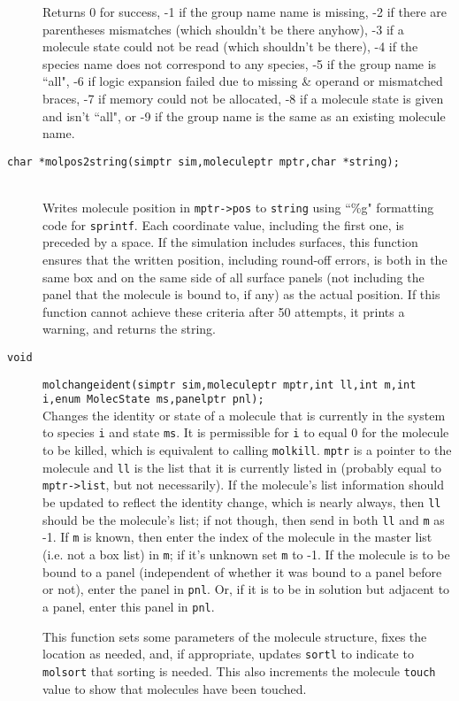 \documentclass {scrbook}
\newcommand {\ttt} {\texttt}
\begin{document}
\begin{description}
Returns 0 for success, -1 if the group name name is missing, -2 if there are parentheses mismatches (which shouldn't be there anyhow), -3 if a molecule state could not be read (which shouldn't be there), -4 if the species name does not correspond to any species, -5 if the group name is ``all", -6 if logic expansion failed due to missing \& operand or mismatched braces, -7 if memory could not be allocated, -8 if a molecule state is given and isn't ``all", or -9 if the group name is the same as an existing molecule name.

\item[\ttt{char *molpos2string(simptr sim,moleculeptr mptr,char *string);}]
\hfill \\
Writes molecule position in \ttt{mptr->pos} to \ttt{string} using ``\%g" formatting code for \ttt{sprintf}. Each coordinate value, including the first one, is preceded by a space. If the simulation includes surfaces, this function ensures that the written position, including round-off errors, is both in the same box and on the same side of all surface panels (not including the panel that the molecule is bound to, if any) as the actual position. If this function cannot achieve these criteria after 50 attempts, it prints a warning, and returns the string.

\item[\ttt{void}]
\ttt{molchangeident(simptr sim,moleculeptr mptr,int ll,int m,int i,enum MolecState ms,panelptr pnl);} \\
Changes the identity or state of a molecule that is currently in the system to species \ttt{i} and state \ttt{ms}. It is permissible for \ttt{i} to equal 0 for the molecule to be killed, which is equivalent to calling \ttt{molkill}. \ttt{mptr} is a pointer to the molecule and \ttt{ll} is the list that it is currently listed in (probably equal to \ttt{mptr->list}, but not necessarily). If the molecule's list information should be updated to reflect the identity change, which is nearly always, then \ttt{ll} should be the molecule's list; if not though, then send in both \ttt{ll} and \ttt{m} as -1. If \ttt{m} is known, then enter the index of the molecule in the master list (i.e. not a box list) in \ttt{m}; if it's unknown set \ttt{m} to -1. If the molecule is to be bound to a panel (independent of whether it was bound to a panel before or not), enter the panel in \ttt{pnl}. Or, if it is to be in solution but adjacent to a panel, enter this panel in \ttt{pnl}.

This function sets some parameters of the molecule structure, fixes the location as needed, and, if appropriate, updates \ttt{sortl} to indicate to \ttt{molsort} that sorting is needed. This also increments the molecule \ttt{touch} value to show that molecules have been touched.


\end{description}
\end{document}
